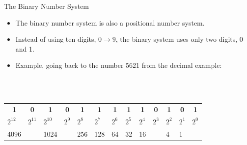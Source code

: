 \documentclass[graphics]{beamer}
\newcommand*{\thead}[1]{\multicolumn{1}{c}{\bfseries #1}}
\begin{document}
\begin{frame}{The Binary Number System}
    \begin{itemize}
        \item The binary number system is also a positional number system.
        \item Instead of using ten digits, $0\rightarrow9$, the binary system uses only two digits, 0 and 1.
        \item Example, going back to the number 5621 from the decimal example:
    \end{itemize}
    \\ ~~ \\
    \begin{tabular}{ l l l l l l l l l l l l l }
        \thead{1} & \thead{0} & \thead{1} & \thead{0} & \thead{1} & \thead{1} & \thead{1} & \thead{1} & \thead{1} & \thead{0} & \thead{1} & \thead{0} & \thead{1} \\
        $2^{12}$ & $2^{11}$ & $2^{10}$ & $2^9$ & $2^8$ & $2^7$ & $2^6$ & $2^5$ & $2^4$ & $2^3$ & $2^2$ & $2^1$ & $2^0$ \\
        4096 & & 1024 & & 256 & 128 & 64 & 32 & 16 & & 4 & 1
    \end{tabular}
\end{frame}
\end{document}
